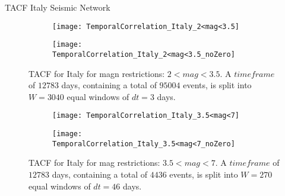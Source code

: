 \begin{frame}{TACF Italy Seismic Network}

\begin{figure}[!ht]
\begin{subfigure}{.5\textwidth}
  \centering
  \texttt{[image: TemporalCorrelation\_Italy\_2<mag<3.5]}
  \label{fig:corrItaly2_3.5}
\end{subfigure}%
\begin{subfigure}{.5\textwidth}
  \centering
  \texttt{[image: TemporalCorrelation\_Italy\_2<mag<3.5\_noZero]}
  \label{fig:corrItaly2_3.5_noZero}
\end{subfigure}
\caption{TACF for Italy for magn restrictions: $2<mag<3.5$. A $timeframe$ of $12783$ days, containing a total of $95004$ events, is split into $W=3040$ equal windows of $dt=3$ days.}
\label{fig:corrItaly2_3.5!}
\end{figure}

\begin{figure}[!ht]
\begin{subfigure}{.5\textwidth}
  \centering
  \texttt{[image: TemporalCorrelation\_Italy\_3.5<mag<7]}
  \label{fig:corrItaly3.5_7}
\end{subfigure}%
\begin{subfigure}{.5\textwidth}
  \centering
  \texttt{[image: TemporalCorrelation\_Italy\_3.5<mag<7\_noZero]}
  \label{fig:corrItaly3.5_7_noZero}
\end{subfigure}
\caption{TACF for Italy for mag restrictions: $3.5<mag<7$. A $timeframe$ of $12783$ days, containing a total of $4436$ events, is split into $W=270$ equal windows of $dt=46$ days.}
\label{fig:corrItaly3.5_7!}
\end{figure}
\end{frame}


